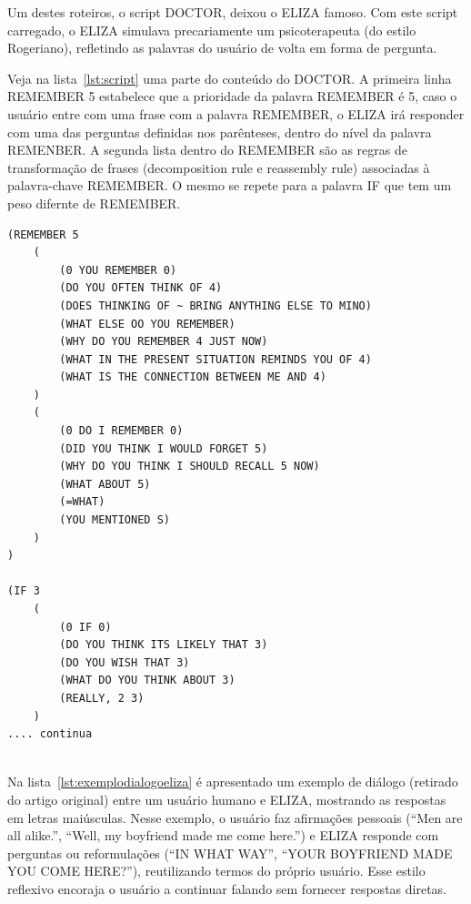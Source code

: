 \documentclass[14pt,a4paper,oneside]{book}
\begin{document}
Um destes roteiros, o script DOCTOR, deixou o ELIZA famoso. 
Com este script carregado, o ELIZA simulava precariamente um psicoterapeuta (do estilo Rogeriano), refletindo as palavras do usuário de volta em forma de pergunta. 


Veja na lista~\ref{lst:script} uma parte do conteúdo do DOCTOR. A primeira linha REMEMBER 5 estabelece que a prioridade da palavra REMEMBER é 5, caso o usuário entre com uma frase com a palavra REMEMBER, o ELIZA irá responder com uma das perguntas definidas nos parênteses, dentro do nível da palavra REMENBER. 
A segunda lista dentro do REMEMBER são as regras de transformação de frases (decomposition rule e reassembly rule) associadas à palavra-chave REMEMBER. O mesmo se repete para a palavra IF que tem um peso difernte de REMEMBER.

\begin{lstlisting}[caption=Roteiro Script Doctor, label=lst:script]
(REMEMBER 5 
	(
		(0 YOU REMEMBER 0) 
		(DO YOU OFTEN THINK OF 4) 
		(DOES THINKING OF ~ BRING ANYTHING ELSE TO MINO) 
		(WHAT ELSE OO YOU REMEMBER)
		(WHY DO YOU REMEMBER 4 JUST NOW) 
		(WHAT IN THE PRESENT SITUATION REMINDS YOU OF 4) 
		(WHAT IS THE CONNECTION BETWEEN ME AND 4)
	) 
	(
		(0 DO I REMEMBER 0) 
		(DID YOU THINK I WOULD FORGET 5) 
		(WHY DO YOU THINK I SHOULD RECALL 5 NOW) 
		(WHAT ABOUT 5) 
		(=WHAT) 
		(YOU MENTIONED S)
	) 
) 

(IF 3 
	(
		(0 IF 0) 
		(DO YOU THINK ITS LIKELY THAT 3) 
		(DO YOU WISH THAT 3) 
		(WHAT DO YOU THINK ABOUT 3) 
		(REALLY, 2 3)
	)
.... continua
	
\end{lstlisting}

Na lista~\ref{lst:exemplodialogoeliza} é apresentado um exemplo de diálogo (retirado do artigo original) entre um usuário humano e ELIZA, mostrando as respostas em letras maiúsculas. 
Nesse exemplo, o usuário faz afirmações pessoais (“Men are all alike.”, “Well, my boyfriend made me come here.”) e ELIZA responde com perguntas ou reformulações (“IN WHAT WAY”, “YOUR BOYFRIEND MADE YOU COME HERE?”), reutilizando termos do próprio usuário. Esse estilo reflexivo encoraja o usuário a continuar falando sem fornecer respostas diretas.
\end{document}
